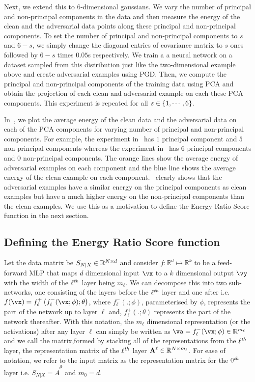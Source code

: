 Next, we extend this to \(6\)-dimensional gaussians. We vary the number of
principal and non-principal components in the data and then measure the energy
of the clean and the adversarial data points along these principal and
non-principal components. To set the number of principal and non-principal
components to \(s\) and \(6-s\), we simply change the diagonal entries of
covariance matrix to \(s\) ones followed by \(6-s\) times \(0.05\)s
respectively. We train a a neural network on a dataset sampled from this
distribution just like the two-dimensional example above and create adversarial
examples using PGD. Then, we compute the principal and non-principal components
of the training data using PCA and obtain the projection of each clean and
adversarial example on each these PCA components. This experiment is repeated
for all \(s\in\left\{{1,\cdots,6}\right\}\).

In~, we plot the average energy of the clean
data and the adversarial data on each of the PCA components for varying number
of principal and non-principal components. For example, the experiment
in~ has \(1\) principal component and \(5\) non-principal
components whereas the experiment in~ has \(6\) principal
components and \(0\) non-principal components. The {\color{orange} orange} lines show the average energy of adversarial examples on each component and the {\color{blue} blue} line shows the average energy of the clean example on each component.~ clearly shows that the adversarial examples have a similar energy on the principal components as clean examples but have a much higher energy on the non-principal components than the clean examples. We use this as a motivation to define the Energy Ratio Score function in the next section.


\subsection{Defining the Energy Ratio Score function}
Let the data matrix be \(S_{N\vert X}\in\mathbb{R}^{N\times d}\) and consider $f:
\mathbb{R}^d \mapsto \mathbb{R}^k$ to be a feed-forward MLP that maps $d$
dimensional input $\vx$ to a $k$ dimensional output $\vy$ with the width of the
\(\ell^{\it th}\) layer being \(m_\ell\). We can decompose this into two
sub-networks, one consisting of the layers before the $\ell^{\it th}$ layer and
one after i.e.  $f(\vx) = f^{+}_\ell\br{f^{-}_\ell(\vx; \phi) ; \theta}$, where
$f^{-}_\ell (.;\phi)$, parameterised by $\phi$, represents the part of the
network up to layer $\ell$ and, $f^{+}_\ell(.;\theta)$ represents the part of
the network thereafter. With this notation, the $m_\ell$ dimensional
representation (or the activations) after any layer $\ell$ can simply be written
as $\va = f^{-}_\ell(\vx; \phi) \in \mathbb{R}^{m_\ell}$ and we call the
matrix,formed by stacking all of the representations from the \(\ell^{\it th}\)
layer, the representation  matrix of the \(\ell^{\it th}\) layer
\({\mathbf{A}}^{\ell}\in\mathbb{R}^{N\times m_\ell}\). For ease of notation, we refer to
the input matrix  as the representation matrix for the \(0^{\it th}\) layer i.e.
\(S_{N\vert X}=\vec{A}^0\) and \(m_0 = d\).

